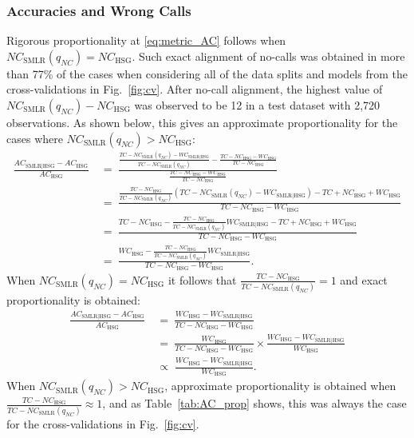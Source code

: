 \documentclass[preprint,5p,times,11pt]{elsarticle}
\begin{document}
\subsubsection*{Accuracies and Wrong Calls}
Rigorous proportionality at \eqref{eq:metric_AC} follows when $NC_{\text{SMLR}}(q_{NC}) = NC_{\text{HSG}}$.
Such exact alignment of no-calls was obtained in more than 77\% of the cases when considering all of the data splits and models from the cross-validations in Fig.~\ref{fig:cv}.
After no-call alignment, the highest value of $NC_{\text{SMLR}}(q_{NC}) - NC_{\text{HSG}}$ was observed to be 12 in a test dataset with 2,720 observations.
As shown below, this gives an approximate proportionality for the cases where $NC_{\text{SMLR}}(q_{NC}) > NC_{\text{HSG}}$:
\begin{align*}
\frac{AC_{\text{SMLR}\mid\text{HSG}} - AC_{\text{HSG}}}{AC_{\text{HSG}}}
\ &= \ 
\frac{\frac{TC - NC_{\text{SMLR}}(q_{NC}) - WC_{\text{SMLR}\mid\text{HSG}}}{TC - NC_{\text{SMLR}}(q_{NC})} - \frac{TC - NC_{\text{HSG}} - WC_{\text{HSG}}}{TC - NC_{\text{HSG}}}}{\frac{TC - NC_{\text{HSG}} - WC_{\text{HSG}}}{TC - NC_{\text{HSG}}}} \\
\ &= \ 
\frac{\frac{TC - NC_{\text{HSG}}}{TC - NC_{\text{SMLR}}(q_{NC})} \left(TC - NC_{\text{SMLR}}(q_{NC}) - WC_{\text{SMLR}\mid\text{HSG}}\right) - TC + NC_{\text{HSG}} + WC_{\text{HSG}}}{TC - NC_{\text{HSG}} - WC_{\text{HSG}}} \\
\ &= \ 
\frac{TC - NC_{\text{HSG}} - \frac{TC - NC_{\text{HSG}}}{TC - NC_{\text{SMLR}}(q_{NC})} WC_{\text{SMLR}\mid\text{HSG}} - TC + NC_{\text{HSG}} + WC_{\text{HSG}}}{TC - NC_{\text{HSG}} - WC_{\text{HSG}}} \\
\ &= \ 
\frac{WC_{\text{HSG}} - \frac{TC - NC_{\text{HSG}}}{TC - NC_{\text{SMLR}}(q_{NC})} WC_{\text{SMLR}\mid\text{HSG}}}{TC - NC_{\text{HSG}} - WC_{\text{HSG}}}.
\end{align*}
When $NC_{\text{SMLR}}(q_{NC}) = NC_{\text{HSG}}$ it follows that $\frac{TC - NC_{\text{HSG}}}{TC - NC_{\text{SMLR}}(q_{NC})} = 1$ and exact proportionality is obtained:
\begin{align}
\frac{AC_{\text{SMLR}\mid\text{HSG}} - AC_{\text{HSG}}}{AC_{\text{HSG}}}
\ &= \ 
\frac{WC_{\text{HSG}} - WC_{\text{SMLR}\mid\text{HSG}}}{TC - NC_{\text{HSG}} - WC_{\text{HSG}}} \nonumber\\
\ &= \ 
\frac{WC_{\text{HSG}}}{TC - NC_{\text{HSG}} - WC_{\text{HSG}}} \times \frac{WC_{\text{HSG}} - WC_{\text{SMLR}\mid\text{HSG}}}{WC_{\text{HSG}}} \nonumber\\
\; &\propto \; 
\frac{WC_{\text{HSG}} - WC_{\text{SMLR}\mid\text{HSG}}}{WC_{\text{HSG}}}.\label{eq:prop_AC}
\end{align}
When $NC_{\text{SMLR}}(q_{NC}) > NC_{\text{HSG}}$, approximate proportionality is obtained when $\frac{TC - NC_{\text{HSG}}}{TC - NC_{\text{SMLR}}(q_{NC})} \approx 1$, and as Table~\ref{tab:AC_prop} shows, this was always the case for the cross-validations in Fig.~\ref{fig:cv}.
\end{document}
